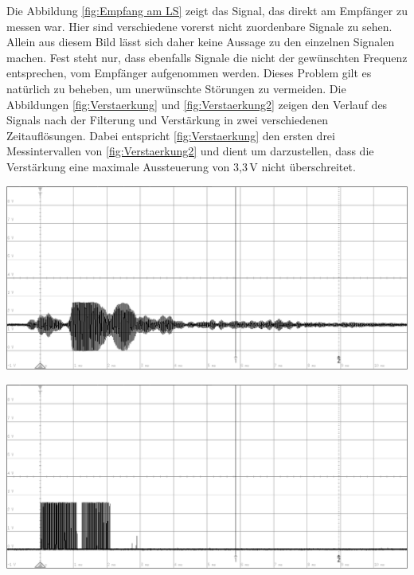 Die Abbildung \ref{fig:Empfang am LS} zeigt das Signal, das direkt am Empfänger zu messen war. Hier sind verschiedene vorerst nicht zuordenbare Signale zu sehen. Allein aus diesem Bild lässt sich daher keine Aussage zu den einzelnen Signalen machen. Fest steht nur, dass ebenfalls Signale die nicht der gewünschten Frequenz entsprechen, vom Empfänger aufgenommen werden. Dieses Problem gilt es natürlich zu beheben, um unerwünschte Störungen zu vermeiden.
Die Abbildungen \ref{fig:Verstaerkung} und \ref{fig:Verstaerkung2} zeigen den Verlauf des Signals nach der Filterung und Verstärkung in zwei verschiedenen Zeitauflösungen. Dabei entspricht \ref{fig:Verstaerkung} den ersten drei Messintervallen von \ref{fig:Verstaerkung2} und dient um darzustellen, dass die Verstärkung eine maximale Aussteuerung von 3,3\,V nicht überschreitet.\\
\begin{minipage}{0.46\textwidth}
\includegraphics[width=1\textwidth%
]{Abbildungen/MessungenP1/Signal-nach-Verstarkung2.png}
\label{fig:Verstaerkung2}
\end{minipage}\qquad
\begin{minipage}{0.46\textwidth}
\includegraphics[width=1\textwidth%
]{Abbildungen/MessungenP1/Signal-nach-Komparator.png}
\label{fig:Komparator}
\end{minipage}\\

